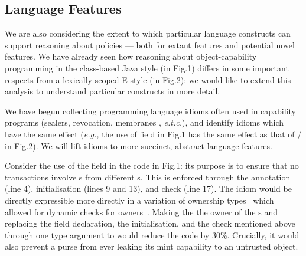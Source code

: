 \subsection{Language Features}

We are also considering the extent to which particular language
constructs can support reasoning about policies --- both for extant
features and potential novel features.  We have already seen how
reasoning about object-capability programming in the class-based Java
style (in Fig.1) differs in some important respects from a
lexically-scoped E style (in Fig.2): we would like to extend this
analysis to understand particular constructs in more detail.

We have begun collecting programming language idioms   often used in capability programs
(\eg sealers, revocation, membranes \cite{membranes,membranesJavascript,MillerPhD}, {\em e.t.c.}), and
 identify idioms which have the same effect ({\em e.g.,} the use of field   in Fig.1 has the same effect as that of / in Fig.2).
%
We will %
lift idioms to more succinct, abstract language features.

Consider the use of the field  in the code in Fig.1: its
purpose is to ensure
that  no transactions involve s from different  s.  This is enforced through  the  %
annotation (line 4), %
 initialisation (lines 9 and 13), and check (line  17).  The idiom
 would be directly expressible
  more directly in a variation of ownership
  types~\cite{ClaPotNobOOPSLA98} which allowed for dynamic checks for
  owners~\cite{dynamicOwn,aliasICSE2013}. Making  the  the owner of the  s and
  replacing  the field declaration, the initialisation, and the check
  mentioned above through one type argument to    would reduce
  the code by 30\%.
Crucially, it would also prevent a purse from
ever leaking its mint capability to an untrusted object.

